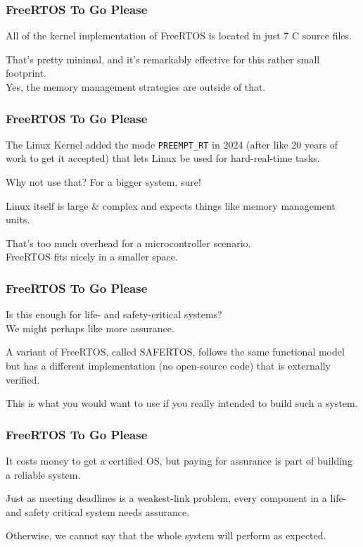 \begin{frame}
\frametitle{FreeRTOS To Go Please}

All of the kernel implementation of FreeRTOS is located in just 7 C source files. 

That's pretty minimal, and it's remarkably effective for this rather small footprint.\\
\quad Yes, the memory management strategies are outside of that. 

\end{frame}


\begin{frame}
\frametitle{FreeRTOS To Go Please}

The Linux Kernel added the mode \texttt{PREEMPT\_RT} in 2024 (after like 20 years of work to get it accepted) that lets Linux be used for hard-real-time tasks.

Why not use that? For a bigger system, sure! 

Linux itself is large \& complex and expects things like memory management units. 

That's too much overhead for a microcontroller scenario.\\
\quad FreeRTOS fits nicely in a smaller space.

\end{frame}


\begin{frame}
\frametitle{FreeRTOS To Go Please}

Is this enough for life- and safety-critical systems?\\
\quad We might perhaps like more assurance. 

A variant of FreeRTOS, called SAFERTOS, follows the same functional model but has a different implementation (no open-source code) that is externally verified.

This is what you would want to use if you really intended to build such a system. 

\end{frame}


\begin{frame}
\frametitle{FreeRTOS To Go Please}

It costs money to get a certified OS, but paying for assurance is part of building a reliable system. 

Just as meeting deadlines is a weakest-link problem, every component in a life- and safety critical system needs assurance.

Otherwise, we cannot say that the whole system will perform as expected.

\end{frame}





